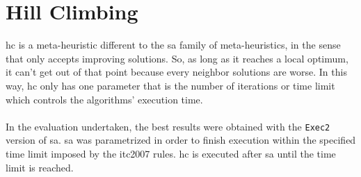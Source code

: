 \section{Hill Climbing}
\label{sec:HillClimbing}

\gls{hc} is a meta-heuristic different to the \gls{sa} family of meta-heuristics, in the sense that only accepts improving solutions. So, as long as it reaches a local optimum, it can't get out of that point because every neighbor solutions are worse. In this way, \gls{hc} only has one parameter that is the number of iterations or time limit which controls the algorithms' execution time.\\
\\
In the evaluation undertaken, the best results were obtained with the \verb+Exec2+ version of \gls{sa}. \gls{sa} was parametrized in order to finish execution within the specified time limit imposed by the \gls{itc2007} rules. \gls{hc} is executed after \gls{sa} until the time limit is reached.

